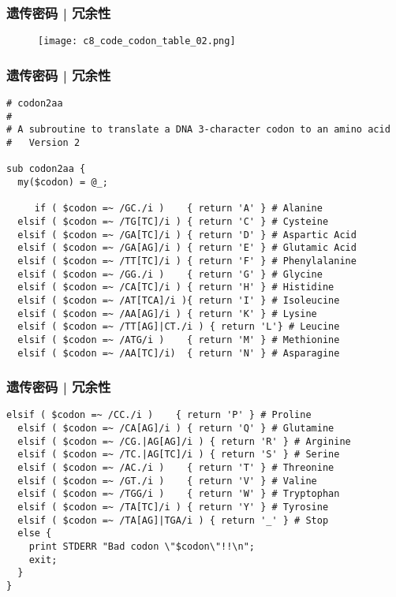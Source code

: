 \begin{frame}
  \frametitle{遗传密码 | 冗余性}
  \begin{figure}
    \centering
    \texttt{[image: c8\_code\_codon\_table\_02.png]}
  \end{figure}
\end{frame}

\begin{frame}[fragile]
  \frametitle{遗传密码 | 冗余性}
\begin{lstlisting}[firstnumber=1,basicstyle=\scriptsize\tt,numberstyle=\tiny]
# codon2aa
#
# A subroutine to translate a DNA 3-character codon to an amino acid
#   Version 2

sub codon2aa {
  my($codon) = @_;
     
     if ( $codon =~ /GC./i )    { return 'A' } # Alanine
  elsif ( $codon =~ /TG[TC]/i ) { return 'C' } # Cysteine
  elsif ( $codon =~ /GA[TC]/i ) { return 'D' } # Aspartic Acid
  elsif ( $codon =~ /GA[AG]/i ) { return 'E' } # Glutamic Acid
  elsif ( $codon =~ /TT[TC]/i ) { return 'F' } # Phenylalanine
  elsif ( $codon =~ /GG./i )    { return 'G' } # Glycine
  elsif ( $codon =~ /CA[TC]/i ) { return 'H' } # Histidine
  elsif ( $codon =~ /AT[TCA]/i ){ return 'I' } # Isoleucine
  elsif ( $codon =~ /AA[AG]/i ) { return 'K' } # Lysine
  elsif ( $codon =~ /TT[AG]|CT./i ) { return 'L'} # Leucine
  elsif ( $codon =~ /ATG/i )    { return 'M' } # Methionine
  elsif ( $codon =~ /AA[TC]/i)  { return 'N' } # Asparagine
\end{lstlisting}
\end{frame}

\begin{frame}[fragile]
  \frametitle{遗传密码 | 冗余性}
\begin{lstlisting}[firstnumber=21,basicstyle=\scriptsize\tt,numberstyle=\tiny]
  elsif ( $codon =~ /CC./i )    { return 'P' } # Proline
  elsif ( $codon =~ /CA[AG]/i ) { return 'Q' } # Glutamine
  elsif ( $codon =~ /CG.|AG[AG]/i ) { return 'R' } # Arginine
  elsif ( $codon =~ /TC.|AG[TC]/i ) { return 'S' } # Serine
  elsif ( $codon =~ /AC./i )    { return 'T' } # Threonine
  elsif ( $codon =~ /GT./i )    { return 'V' } # Valine
  elsif ( $codon =~ /TGG/i )    { return 'W' } # Tryptophan
  elsif ( $codon =~ /TA[TC]/i ) { return 'Y' } # Tyrosine
  elsif ( $codon =~ /TA[AG]|TGA/i ) { return '_' } # Stop
  else {
    print STDERR "Bad codon \"$codon\"!!\n";
    exit;
  }
}
\end{lstlisting}
\end{frame}

